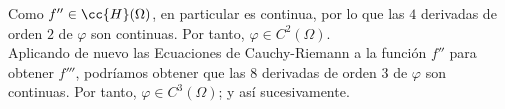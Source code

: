\documentclass[12pt]{article}
\begin{document}
\begin{ejercicio}
\begin{enumerate}
            Como $f''\in \cc{H}(\Omega)$, en particular es continua, por lo que las $4$ derivadas de orden $2$ de $\varphi$ son continuas. Por tanto, $\varphi\in C^2(\Omega)$.\\

            Aplicando de nuevo las Ecuaciones de Cauchy-Riemann a la función $f''$ para obtener $f'''$, podríamos obtener que las $8$ derivadas de orden $3$ de $\varphi$ son continuas. Por tanto, $\varphi\in C^3(\Omega)$; y así sucesivamente.

        \end{enumerate}
    \end{ejercicio}
\end{document}
